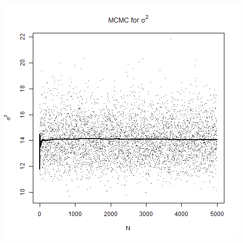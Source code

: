 \documentclass{article}
\begin{document}
\begin{enumerate}[8.1]
\begin{enumerate}[(a)]
\includegraphics[scale = 0.3]{sig-b.png}\\


\end{enumerate}
\end{enumerate}
\end{document}

